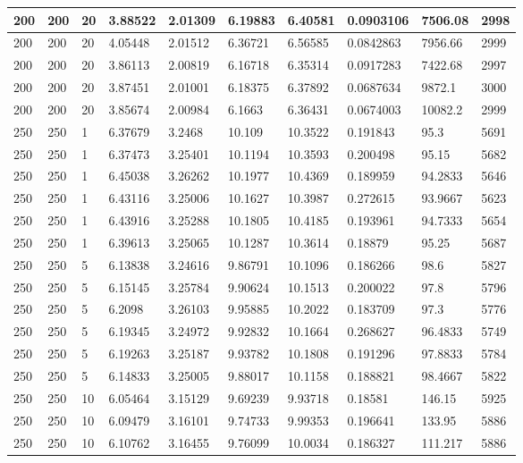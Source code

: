 \begin{landscape}
\begin{longtable}{ | l | l | l | l | l | l | l | l | l | l | }
200 & 200 & 20 & 3.88522 & 2.01309 & 6.19883 & 6.40581 & 0.0903106 & 7506.08 & 2998\\ \hline
200 & 200 & 20 & 4.05448 & 2.01512 & 6.36721 & 6.56585 & 0.0842863 & 7956.66 & 2999\\ \hline
200 & 200 & 20 & 3.86113 & 2.00819 & 6.16718 & 6.35314 & 0.0917283 & 7422.68 & 2997\\ \hline
200 & 200 & 20 & 3.87451 & 2.01001 & 6.18375 & 6.37892 & 0.0687634 & 9872.1 & 3000\\ \hline
200 & 200 & 20 & 3.85674 & 2.00984 & 6.1663 & 6.36431 & 0.0674003 & 10082.2 & 2999\\ \hline
250 & 250 & 1 & 6.37679 & 3.2468 & 10.109 & 10.3522 & 0.191843 & 95.3 & 5691\\ \hline
250 & 250 & 1 & 6.37473 & 3.25401 & 10.1194 & 10.3593 & 0.200498 & 95.15 & 5682\\ \hline
250 & 250 & 1 & 6.45038 & 3.26262 & 10.1977 & 10.4369 & 0.189959 & 94.2833 & 5646\\ \hline
250 & 250 & 1 & 6.43116 & 3.25006 & 10.1627 & 10.3987 & 0.272615 & 93.9667 & 5623\\ \hline
250 & 250 & 1 & 6.43916 & 3.25288 & 10.1805 & 10.4185 & 0.193961 & 94.7333 & 5654\\ \hline
250 & 250 & 1 & 6.39613 & 3.25065 & 10.1287 & 10.3614 & 0.18879 & 95.25 & 5687\\ \hline
250 & 250 & 5 & 6.13838 & 3.24616 & 9.86791 & 10.1096 & 0.186266 & 98.6 & 5827\\ \hline
250 & 250 & 5 & 6.15145 & 3.25784 & 9.90624 & 10.1513 & 0.200022 & 97.8 & 5796\\ \hline
250 & 250 & 5 & 6.2098 & 3.26103 & 9.95885 & 10.2022 & 0.183709 & 97.3 & 5776\\ \hline
250 & 250 & 5 & 6.19345 & 3.24972 & 9.92832 & 10.1664 & 0.268627 & 96.4833 & 5749\\ \hline
250 & 250 & 5 & 6.19263 & 3.25187 & 9.93782 & 10.1808 & 0.191296 & 97.8833 & 5784\\ \hline
250 & 250 & 5 & 6.14833 & 3.25005 & 9.88017 & 10.1158 & 0.188821 & 98.4667 & 5822\\ \hline
250 & 250 & 10 & 6.05464 & 3.15129 & 9.69239 & 9.93718 & 0.18581 & 146.15 & 5925\\ \hline
250 & 250 & 10 & 6.09479 & 3.16101 & 9.74733 & 9.99353 & 0.196641 & 133.95 & 5886\\ \hline
250 & 250 & 10 & 6.10762 & 3.16455 & 9.76099 & 10.0034 & 0.186327 & 111.217 & 5886\\ \hline

\end{longtable}
\end{landscape}
